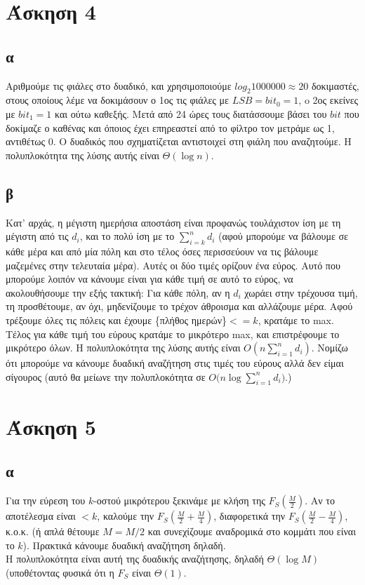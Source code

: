\documentclass[12pt,a4paper]{article}
\begin{document}
  \section{Άσκηση 4}

  \subsection{α}
    Αριθμούμε τις φιάλες στο δυαδικό, και χρησιμοποιούμε \(log_{2}{1000000}
    \approx 20 \) δοκιμαστές, στους οποίους λέμε να δοκιμάσουν ο 1ος τις φιάλες
    με \(LSB=bit_{0}=1\), o 2ος εκείνες με \(bit_{1}=1\) και ούτω καθεξής.
    Μετά από 24 ώρες τους διατάσσουμε βάσει του \(bit\) που δοκίμαζε ο καθένας
    και όποιος έχει επηρεαστεί από το φίλτρο τον μετράμε ως 1, αντιθέτως 0.
    Ο δυαδικός που σχηματίζεται αντιστοιχεί στη φιάλη που αναζητούμε. Η 
    πολυπλοκότητα της λύσης αυτής είναι \( \Theta(\log{n}) \).

  \subsection{β}
    Κατ' αρχάς, η μέγιστη ημερήσια αποστάση είναι προφανώς τουλάχιστον ίση με τη
    μέγιστη από τις \( d_i \), και το πολύ ίση με το \( \sum_{i=k}^{n}d_i \)
    (αφού μπορούμε να βάλουμε σε κάθε μέρα και από μία πόλη και στο τέλος 
    όσες περισσεύουν να τις βάλουμε μαζεμένες στην τελευταία μέρα).
    Αυτές οι δύο τιμές ορίζουν ένα εύρος. Αυτό που μπορούμε λοιπόν να κάνουμε
    είναι για κάθε τιμή σε αυτό το εύρος, να ακολουθήσουμε την εξής τακτική:
    Για κάθε πόλη, αν η \( d_i \) χωράει στην τρέχουσα τιμή, τη προσθέτουμε,
    αν όχι, μηδενίζουμε το τρέχον άθροισμα και αλλάζουμε μέρα. Αφού τρέξουμε
    όλες τις πόλεις και έχουμε \{πλήθος ημερών\}\( <= k \), κρατάμε το 
    {\latintext max}.
    Τέλος για κάθε τιμή του εύρους κρατάμε το μικρότερο {\latintext max}, και
    επιστρέφουμε το μικρότερο όλων.
    Η πολυπλοκότητα της λύσης αυτής είναι \( O(n\sum_{i=1}^{n}d_i) \).
    Νομίζω ότι μπορούμε να κάνουμε δυαδική αναζήτηση στις τιμές του εύρους αλλά
    δεν είμαι σίγουρος (αυτό θα μείωνε την πολυπλοκότητα σε 
    \( O(n\log{\sum_{i=1}^{n}d_i)} \).)
  
  \section{Άσκηση 5}

  \subsection{α}
    Για την εύρεση του \( k \)-οστού μικρότερου ξεκινάμε με κλήση της 
    \( F_S{(\frac{M}{2})} \). Αν το αποτέλεσμα είναι \( <k \), καλούμε
    την \( F_S{(\frac{M}{2} + \frac{M}{4})} \), διαφορετικά την
    \( F_S{(\frac{M}{2} - \frac{M}{4})} \), κ.ο.κ. (ή απλά θέτουμε
    \( M=M/2 \) και συνεχίζουμε αναδρομικά στο κομμάτι που είναι το \( k \)).
    Πρακτικά κάνουμε δυαδική αναζήτηση δηλαδή.\\
    Η πολυπλοκότητα είναι αυτή της δυαδικής αναζήτησης, δηλαδή
    \( \Theta(\log{M}) \) (υποθέτοντας φυσικά ότι η \( F_S \) είναι 
    \( \Theta(1) \).
  
\end{document}
